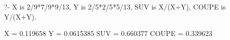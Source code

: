 ?- X is 2/9*7/9*9/13,
Y is 2/5*2/5*5/13,
SUV is X/(X+Y),
COUPE is Y/(X+Y).

X = 0.119658
Y = 0.0615385
SUV = 0.660377
COUPE = 0.339623
